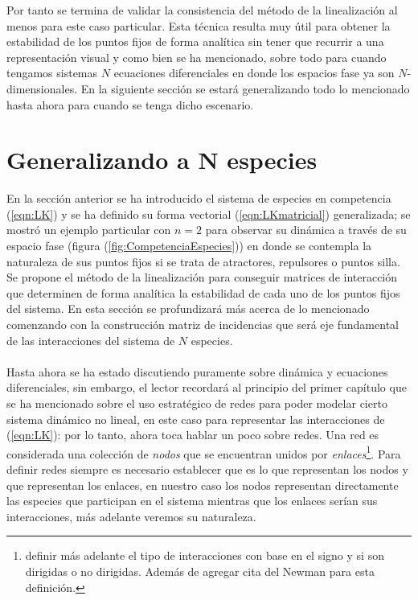 Por tanto se termina de validar la consistencia del método de la linealización al menos para este caso particular. Esta técnica resulta muy útil para obtener la estabilidad de los puntos fijos de forma analítica sin tener que recurrir a una representación visual y como bien se ha mencionado, sobre todo para cuando tengamos sistemas $N$ ecuaciones diferenciales en donde los espacios fase ya son $N$-dimensionales. En la siguiente sección se estará generalizando todo lo mencionado hasta ahora para cuando se tenga dicho escenario.

\section{Generalizando a N especies}

En la sección anterior se ha introducido el sistema de especies en competencia (\ref{eqn:LK}) y se ha definido su forma vectorial (\ref{eqn:LKmatricial}) generalizada; se mostró un ejemplo particular con $n=2$ para observar su dinámica a través de su espacio fase (figura (\ref{fig:CompetenciaEspecies})) en donde se contempla la naturaleza de sus puntos fijos si se trata de atractores, repulsores o puntos silla. Se propone el método de la linealización para conseguir matrices de interacción que determinen de forma analítica la estabilidad de cada uno de los puntos fijos del sistema. En esta sección se profundizará más acerca de lo mencionado comenzando con la construcción matriz de incidencias que será eje fundamental de las interacciones del sistema de $N$ especies. \\
\\
Hasta ahora se ha estado discutiendo puramente sobre dinámica y ecuaciones diferenciales, sin embargo, el lector recordará al principio del primer capítulo que se ha mencionado sobre el uso estratégico de redes para poder modelar cierto sistema dinámico no lineal, en este caso para representar las interacciones de (\ref{eqn:LK}): por lo tanto, ahora toca hablar un poco sobre redes. Una red es considerada una colección de \textit{nodos} que se encuentran unidos por \textit{enlaces}\footnote{definir más adelante el tipo de interacciones con base en el signo y si son dirigidas o no dirigidas. Además de agregar cita del Newman para esta definición.}. Para definir redes siempre es necesario establecer que es lo que representan los nodos y que representan los enlaces, en nuestro caso los nodos representan directamente las especies que participan en el sistema mientras que los enlaces serían sus interacciones, más adelante veremos su naturaleza.\\
